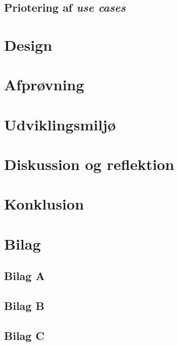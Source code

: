 \documentclass[12pt]{article}
\begin{document}
\subsection{Priotering af \textit{use cases}}

\section{Design}
\label{sec:design}

\section{Afprøvning}
\label{sec:afproevning}

\section{Udviklingsmiljø}
\label{sec:udvikling}

\section{Diskussion og reflektion}
\label{sec:diskussion}

\section{Konklusion}
\label{sec:konklusion}

\section{Bilag}
\label{sec:bilag}

\subsection{Bilag A}
\label{sec:bilagA}

\subsection{Bilag B}
\label{sec:bilagB}

\subsection{Bilag C}
\label{sec:bilagC}
\end{document}
